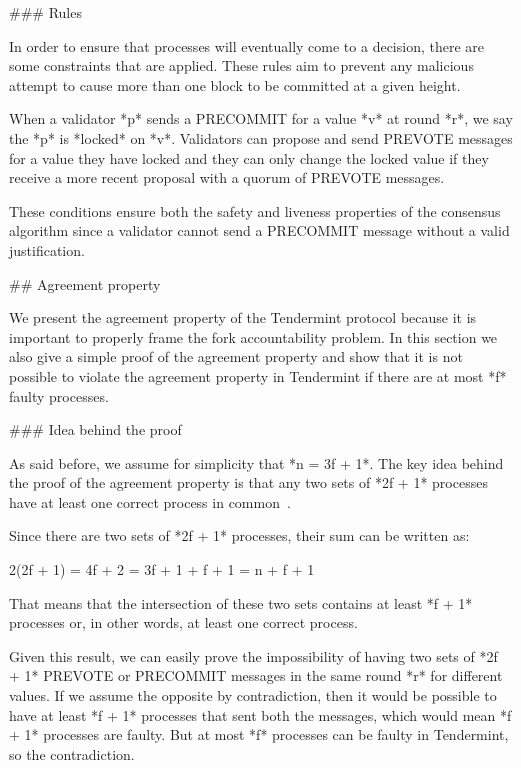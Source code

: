 \documentclass[a4paper,11pt,oneside]{report}
\begin{document}
\begin{markdown}

### Rules

In order to ensure that processes will eventually come to a decision, there are some constraints that are applied. These rules aim to prevent any malicious attempt to cause more than one block to be committed at a given height. 

When a validator *p* sends a PRECOMMIT for a value *v* at round *r*, we say the *p* is *locked* on *v*. Validators can propose and send PREVOTE messages for a value they have locked and they can only change the locked value if they receive a more recent proposal with a quorum of PREVOTE messages. 

These conditions ensure both the safety and liveness properties of the consensus algorithm since a validator cannot send a PRECOMMIT message without a valid justification.

## Agreement property

We present the agreement property of the Tendermint protocol because it is important to properly frame the fork accountability problem. In this section we also give a simple proof of the agreement property and show that it is not possible to violate the agreement property in Tendermint if there are at most *f* faulty processes.

### Idea behind the proof

As said before, we assume for simplicity that *n = 3f + 1*.
The key idea behind the proof of the agreement property is that any two sets of *2f + 1* processes have at least one correct process in common~\cite{buchman2018latest}.

Since there are two sets of *2f + 1* processes, their sum can be written as:
 
    2(2f + 1) = 4f + 2 = 3f + 1 + f + 1 = n + f + 1
     
That means that the intersection of these two sets contains at least *f + 1* processes or, in other words, at least one correct process.  

Given this result, we can easily prove the impossibility of having two sets of *2f + 1* PREVOTE or PRECOMMIT messages in the same round *r* for different values. If we assume the opposite by contradiction, then it would be possible to have at least *f + 1* processes that sent both the messages, which would mean *f + 1* processes are faulty. But at most *f* processes can be faulty in Tendermint, so the contradiction.


\end{markdown}
\end{document}
